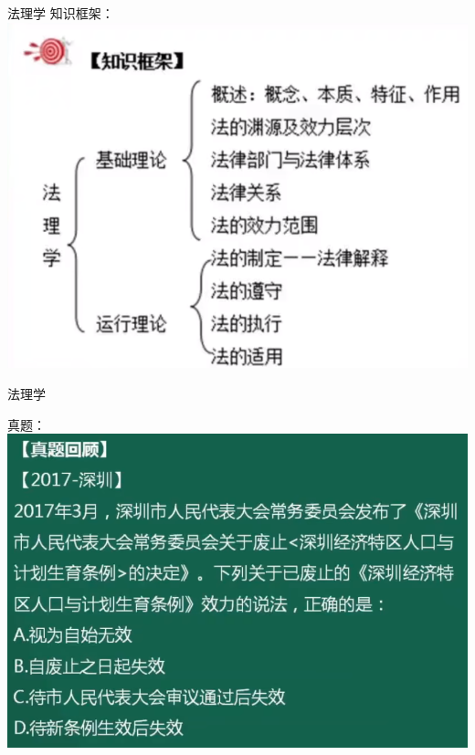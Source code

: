 \documentclass[aspectratio=169]{beamer}
\begin{document}
\begin{frame}[t]{法理学}
    知识框架：\\
    \includegraphics[scale=0.25]{law-theroy}\\ 
\end{frame}



\begin{frame}[t]{法理学}

    真题：\\
    \includegraphics[scale=0.3]{17-1}\\ 
\end{frame}
\end{document}
